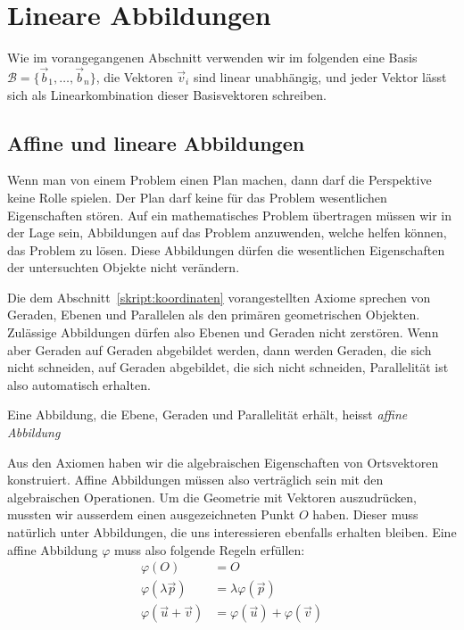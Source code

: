 %
%
%
\section{Lineare Abbildungen%
\label{skript:section:lineare abbildungen}}
Wie im vorangegangenen Abschnitt verwenden wir im folgenden eine Basis
$\mathcal{B}=\{\vec{b}_1,\dots,\vec{b}_n\}$, die Vektoren $\vec{v}_i$
sind linear unabhängig, und jeder Vektor lässt sich als Linearkombination
dieser Basisvektoren schreiben.

%
%
\subsection{Affine und lineare Abbildungen}
Wenn man von einem Problem einen Plan machen, dann darf die Perspektive
keine Rolle spielen.
Der Plan darf keine für das Problem wesentlichen Eigenschaften stören.
Auf ein mathematisches Problem übertragen müssen wir in der Lage sein,
Abbildungen auf das Problem anzuwenden, welche helfen können, das
Problem zu lösen.
Diese Abbildungen dürfen die wesentlichen Eigenschaften der untersuchten
Objekte nicht verändern.

Die dem Abschnitt~\ref{skript:koordinaten} vorangestellten Axiome
sprechen von Geraden, Ebenen und Parallelen als den primären geometrischen
Objekten.
Zulässige Abbildungen dürfen also Ebenen und Geraden nicht zerstören.
Wenn aber Geraden auf Geraden abgebildet werden, dann werden Geraden,
die sich nicht schneiden, auf Geraden abgebildet, die sich nicht schneiden,
Parallelität ist also automatisch erhalten.

\begin{definition}
Eine Abbildung, die Ebene, Geraden und Parallelität erhält,
heisst {\em affine Abbildung}
\end{definition}

Aus den Axiomen haben wir die algebraischen Eigenschaften von Ortsvektoren
konstruiert.
Affine Abbildungen müssen also verträglich sein mit den algebraischen
Operationen.
Um die Geometrie mit Vektoren auszudrücken, mussten wir ausserdem
einen ausgezeichneten Punkt $O$ haben.
Dieser muss natürlich unter Abbildungen, die uns interessieren
ebenfalls erhalten bleiben.
Eine affine Abbildung $\varphi$ muss also folgende Regeln erfüllen:
\begin{align*}
\varphi(O)&=O
\\
\varphi(\lambda\vec{p})&=\lambda\varphi(\vec{p})
\\
\varphi(\vec{u}+\vec{v})&=\varphi(\vec{u}) + \varphi(\vec{v})
\end{align*}

